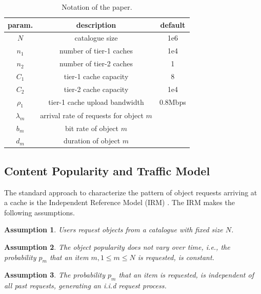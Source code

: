 \begin{table}[tb]
\centering
\caption{Notation of the paper.}
\label{tab:notation}
\begin{tabular}{|c|c|c|}
\hline
param. & description & default \\
\hline
$N$ & catalogue size & 1e6 \\
$n_{1}$ & number of tier-1 caches & 1e4 \\
$n_{2}$ & number of tier-2 caches & 1 \\
$C_{1}$ & tier-1 cache capacity & 8 \\
$C_{2}$ & tier-2 cache capacity & 1e4 \\
$\rho_{1}$ & tier-1 cache upload bandwidth & 0.8Mbps \\
$\lambda_m$ & arrival rate of requests for object $m$& \\
$b_m$ & bit rate of object $m$& \\
$d_m$ & duration of object $m$& \\
\hline
\end{tabular}
\end{table}

\subsection{Content Popularity and Traffic Model}\label{sec:hierarchical:background:traffic}
The standard approach to characterize the pattern of object requests arriving at a cache is the Independent Reference Model (IRM) \cite{coffman1973operating}.
The IRM makes the following assumptions.

\newtheorem{irma}{Assumption}\begin{irma}\label{catalouge}
Users request objects from a catalogue with fixed size $N$.
\end{irma}
\newtheorem{irmb}[irma]{Assumption}\begin{irmb}\label{pmc}
The object popularity does not vary over time, i.e., the probability $p_m$ that an item $m, 1\leq m \leq N$ is requested, is constant.
\end{irmb}
\newtheorem{irmc}[irma]{Assumption}\begin{irmc}\label{iid}
The probability $p_m$ that an item is requested, is independent of all past requests, generating an i.i.d request process.
\end{irmc}


